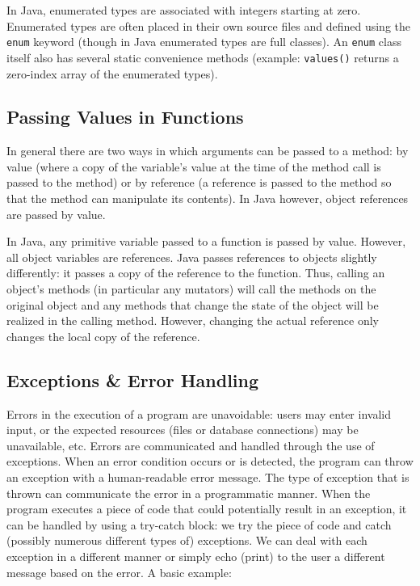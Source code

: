 \documentclass[12pt]{scrartcl}
\begin{document}
In Java, enumerated types are associated with integers starting at zero.  
Enumerated types are often placed in their own source files and defined 
using the \texttt{enum} keyword (though in Java enumerated 
types are full classes).  An \texttt{enum} class itself also has several static 
convenience methods (example: \texttt{values()} returns 
a zero-index array of the enumerated types).

\subsection*{Passing Values in Functions}

In general there are two ways in which arguments can be passed to a method: 
by value (where a copy of the variable's value at the time of the method call is 
passed to the method) or by reference (a reference is passed to the method 
so that the method can manipulate its contents).  In Java however, object 
references are passed by value.

In Java, any primitive variable passed to a function is passed by value.  
However, all object variables are references.  Java passes references to 
objects slightly differently: it passes a copy of the reference to the function.  
Thus, calling an object's methods (in particular any mutators) will call the 
methods on the original object and any methods that change the state of 
the object will be realized in the calling method.  However, changing the 
actual reference only changes the local copy of the reference.  

\subsection*{Exceptions \& Error Handling}

Errors in the execution of a program are unavoidable: users may enter 
invalid input, or the expected resources (files or database connections) 
may be unavailable, etc.  Errors are communicated and handled through 
the use of exceptions.  When an error condition occurs or is detected, 
the program can throw an exception with a human-readable error message.  
The type of exception that is thrown can communicate the error in a 
programmatic manner.  When the program executes a piece of code 
that could potentially result in an exception, it can be handled by using 
a try-catch block: we try the piece of code and catch (possibly numerous 
different types of) exceptions.  We can deal with each exception in a 
different manner or simply echo (print) to the user a different message 
based on the error.  A basic example:
\end{document}
